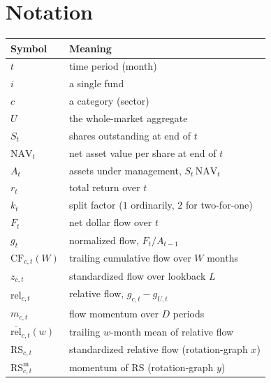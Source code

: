 \documentclass[11pt]{article}
\begin{document}
\appendix
\section{Notation}
\label{app:notation}

\begin{tabular}{ll}
\toprule
Symbol & Meaning \\
\midrule
$t$ & time period (month) \\
$i$ & a single fund \\
$c$ & a category (sector) \\
$U$ & the whole-market aggregate \\
$S_t$ & shares outstanding at end of $t$ \\
$\mathrm{NAV}_t$ & net asset value per share at end of $t$ \\
$A_t$ & assets under management, $S_t\,\mathrm{NAV}_t$ \\
$r_t$ & total return over $t$ \\
$k_t$ & split factor ($1$ ordinarily, $2$ for two-for-one) \\
$F_t$ & net dollar flow over $t$ \\
$g_t$ & normalized flow, $F_t / A_{t-1}$ \\
$\mathrm{CF}_{c,t}(W)$ & trailing cumulative flow over $W$ months \\
$z_{c,t}$ & standardized flow over lookback $L$ \\
$\mathrm{rel}_{c,t}$ & relative flow, $g_{c,t} - g_{U,t}$ \\
$m_{c,t}$ & flow momentum over $D$ periods \\
$\bar{\mathrm{rel}}_{c,t}(w)$ & trailing $w$-month mean of relative flow \\
$\mathrm{RS}_{c,t}$ & standardized relative flow (rotation-graph $x$) \\
$\mathrm{RS}^{\mathrm{m}}_{c,t}$ & momentum of $\mathrm{RS}$ (rotation-graph $y$) \\
\bottomrule
\end{tabular}
\end{document}
